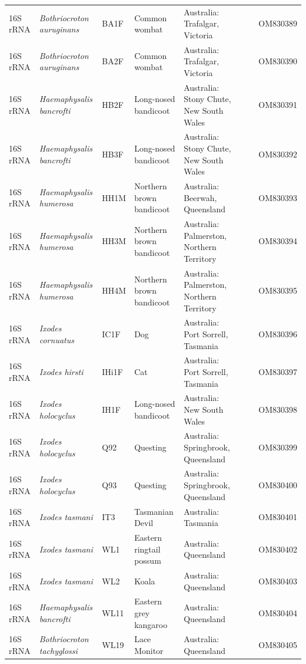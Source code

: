 \documentclass[a4paper, nobind]{templates/ociamthesis}
\begin{document}
\begin{landscape}
\begin{longtable}[t]{l>{}lllllll}
16S rRNA & \em{Bothriocroton auruginans} & BA1F & Common wombat & Australia: Trafalgar, Victoria &  &  & OM830389\\
16S rRNA & \em{Bothriocroton auruginans} & BA2F & Common wombat & Australia: Trafalgar, Victoria &  &  & OM830390\\
16S rRNA & \em{Haemaphysalis bancrofti} & HB2F & Long-nosed bandicoot & Australia: Stony Chute, New South Wales &  &  & OM830391\\
16S rRNA & \em{Haemaphysalis bancrofti} & HB3F & Long-nosed bandicoot & Australia: Stony Chute, New South Wales &  &  & OM830392\\
16S rRNA & \em{Haemaphysalis humerosa} & HH1M & Northern brown bandicoot & Australia: Beerwah, Queensland &  &  & OM830393\\
16S rRNA & \em{Haemaphysalis humerosa} & HH3M & Northern brown bandicoot & Australia: Palmerston, Northern Territory &  &  & OM830394\\
16S rRNA & \em{Haemaphysalis humerosa} & HH4M & Northern brown bandicoot & Australia: Palmerston, Northern Territory &  &  & OM830395\\
16S rRNA & \em{Ixodes cornuatus} & IC1F & Dog & Australia: Port Sorrell, Tasmania &  &  & OM830396\\
16S rRNA & \em{Ixodes hirsti} & IHi1F & Cat & Australia: Port Sorrell, Tasmania &  &  & OM830397\\
16S rRNA & \em{Ixodes holocyclus} & IH1F & Long-nosed bandicoot & Australia: New South Wales &  &  & OM830398\\
16S rRNA & \em{Ixodes holocyclus} & Q92 & Questing & Australia: Springbrook, Queensland &  &  & OM830399\\
16S rRNA & \em{Ixodes holocyclus} & Q93 & Questing & Australia: Springbrook, Queensland &  &  & OM830400\\
16S rRNA & \em{Ixodes tasmani} & IT3 & Tasmanian Devil & Australia: Tasmania &  &  & OM830401\\
16S rRNA & \em{Ixodes tasmani} & WL1 & Eastern ringtail possum & Australia: Queensland &  &  & OM830402\\
16S rRNA & \em{Ixodes tasmani} & WL2 & Koala & Australia: Queensland &  &  & OM830403\\
16S rRNA & \em{Haemaphysalis bancrofti} & WL11 & Eastern grey kangaroo & Australia: Queensland &  &  & OM830404\\
16S rRNA & \em{Bothriocroton tachyglossi} & WL19 & Lace Monitor & Australia: Queensland &  &  & OM830405\\

\end{longtable}
\end{landscape}
\end{document}
